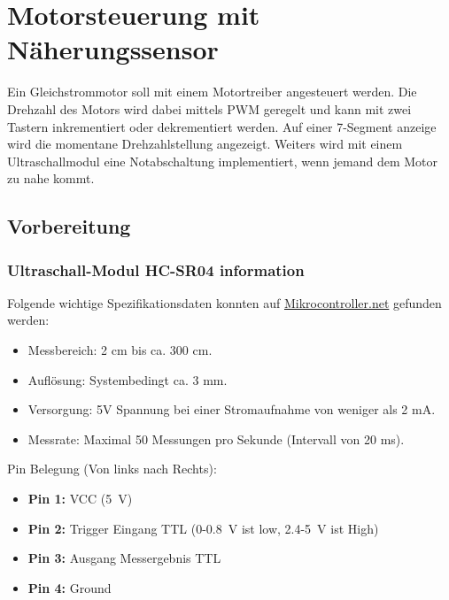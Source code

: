 
\newpage
\section{Motorsteuerung mit Näherungssensor}

Ein Gleichstrommotor soll mit einem Motortreiber angesteuert werden. Die Drehzahl des Motors wird dabei mittels PWM geregelt und kann mit zwei Tastern inkrementiert oder dekrementiert werden. Auf einer 7-Segment anzeige wird die momentane Drehzahlstellung angezeigt. Weiters wird mit einem Ultraschallmodul eine Notabschaltung implementiert, wenn jemand dem Motor zu nahe kommt.

\subsection{Vorbereitung} 

\subsubsection{Ultraschall-Modul HC-SR04 information} 

Folgende wichtige Spezifikationsdaten konnten auf \href{https://www.mikrocontroller.net/attachment/218122/HC-SR04_ultraschallmodul_beschreibung_3.pdf}{Mikrocontroller.net} gefunden werden:

\begin{itemize}[noitemsep]
    \item Messbereich: 2 cm bis ca. 300 cm.
    \item Auflösung: Systembedingt ca. 3 mm.
    \item Versorgung: 5V Spannung bei einer Stromaufnahme von weniger als 2 mA.
    \item Messrate: Maximal 50 Messungen pro Sekunde (Intervall von 20 ms).
\end{itemize}

Pin Belegung (Von links nach Rechts):

\begin{itemize}[noitemsep]
    \item \textbf{Pin 1:} VCC (\SI{5}{\volt})
    \item \textbf{Pin 2:} Trigger Eingang TTL (0-\SI{0.8}{\volt} ist low, 2.4-\SI{5}{\volt} ist High)
    \item \textbf{Pin 3:} Ausgang Messergebnis TTL
    \item \textbf{Pin 4:} Ground
\end{itemize}

